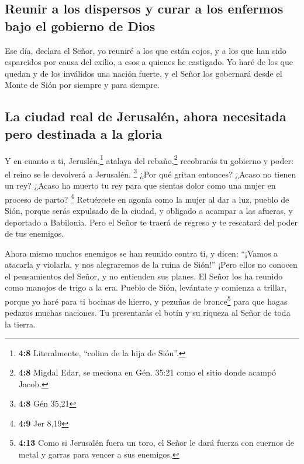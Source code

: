 \hypertarget{reunir-a-los-dispersos-y-curar-a-los-enfermos-bajo-el-gobierno-de-dios}{%
\subsection{Reunir a los dispersos y curar a los enfermos bajo el
gobierno de
Dios}\label{reunir-a-los-dispersos-y-curar-a-los-enfermos-bajo-el-gobierno-de-dios}}

 Ese día, declara el Señor, yo reuniré a los que están
cojos, y a los que han sido esparcidos por causa del exilio, a esos a
quienes he castigado.  Yo haré de los que quedan y de los
inválidos una nación fuerte, y el Señor los gobernará desde el Monte de
Sión por siempre y para siempre.

\hypertarget{la-ciudad-real-de-jerusaluxe9n-ahora-necesitada-pero-destinada-a-la-gloria}{%
\subsection{La ciudad real de Jerusalén, ahora necesitada pero destinada
a la
gloria}\label{la-ciudad-real-de-jerusaluxe9n-ahora-necesitada-pero-destinada-a-la-gloria}}

 Y en cuanto a ti, Jeruslén,\footnote{\textbf{4:8}
  Literalmente, ``colina de la hija de Sión''.} atalaya del
rebaño,\footnote{\textbf{4:8} Migdal Edar, se meciona en Gén. 35:21 como
  el sitio donde acampó Jacob.} recobrarás tu gobierno y poder: el reino
se le devolverá a Jerusalén. \footnote{\textbf{4:8} Gén 35,21}
 ¿Por qué gritan entonces? ¿Acaso no tienen un rey? ¿Acaso
ha muerto tu rey para que sientas dolor como una mujer en proceso de
parto? \footnote{\textbf{4:9} Jer 8,19}  Retuércete en
agonía como la mujer al dar a luz, pueblo de Sión, porque serás
expulsado de la ciudad, y obligado a acampar a las afueras, y deportado
a Babilonia. Pero el Señor te traerá de regreso y te rescatará del poder
de tus enemigos.

 Ahora mismo muchos enemigos se han reunido contra ti, y
dicen: ``¡Vamos a atacarla y violarla, y nos alegraremos de la ruina de
Sión!''  ¡Pero ellos no conocen el pensamientos del
Señor, y no entienden sus planes. El Señor los ha reunido como manojos
de trigo a la era.  Pueblo de Sión, levántate y comienza
a trillar, porque yo haré para ti bocinas de hierro, y pezuñas de
bronce\footnote{\textbf{4:13} Como si Jerusalén fuera un toro, el Señor
  le dará fuerza con cuernos de metal y garras para vencer a sus
  enemigos.} para que hagas pedazos muchas naciones. Tu presentarás el
botín y su riqueza al Señor de toda la tierra.

